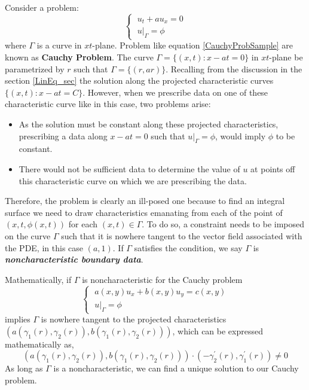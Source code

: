 \documentclass[11pt, a4paper]{report}
\begin{document}
Consider a problem: 
\begin{equation} \label{CauchyProbSample}
    \begin{cases}
        \; u_t + a{u_x} = 0\\[-0.5em]%
        \; u|_\Gamma = \phi
    \end{cases}
\end{equation}
where $\Gamma$ is a curve in $xt$-plane. Problem like equation \eqref{CauchyProbSample} are known as {\bfseries 
Cauchy Problem}. The curve $\Gamma = \{(x,t): x-at = 0\}$ in $xt$-plane be parametrized by $r$ such that 
$\Gamma = \{(r, ar)\}$. Recalling from the discussion in the section \ref{LinEq_sec} the solution along the 
projected characteristic curves $\{(x, t): x - at = C\}$. However, when we prescribe data on one of these 
characteristic curve like in this case, two problems arise:
\begin{itemize}
    \item As the solution must be constant along these projected characteristics, prescribing a data along
    $x-at = 0$ such that $u|_\Gamma = \phi$, would imply $\phi$ to be constant.

    \item There would not be sufficient data to determine the value of $u$ at points off this characteristic
    curve on which we are prescribing the data.
\end{itemize}
Therefore, the problem is clearly an ill-posed one because to find an integral surface we need to draw
characteristics emanating from each of the point of $(x, t, \phi(x, t))$ for each $(x, t)\in\Gamma$. To 
do so, a constraint needs to be imposed on the curve $\Gamma$ such that it is nowhere tangent to the vector
field associated with the PDE, in this case $(a, 1)$. If $\Gamma$ satisfies the condition, we say $\Gamma$
is {\emph{\bfseries noncharacteristic boundary data}}.

Mathematically, if $\Gamma$ is noncharacteristic for the Cauchy problem
\begin{equation*}
    \begin{cases}
        \; a(x,y)u_x + b(x,y)u_y = c(x, y)\\[-0.5em] %
        \; u|_\Gamma = \phi
    \end{cases}
\end{equation*}
implies $\Gamma$ is nowhere tangent to the projected characteristics $\left(a\left(\gamma_{1}(r), 
\gamma_{2}(r)\right), b\left(\gamma_{1}(r), \gamma_{2}(r)\right)\right)$, which can be expressed mathematically
as,
\begin{equation} \label{noncharacteristic}
    (a\left(\gamma_{1}(r), \gamma_{2}(r)\right), b\left(\gamma_{1}(r), \gamma_{2}(r)\right))\cdot\left(-\gamma_{2}^{\prime}(r), \gamma_{1}^{\prime}(r)\right) \neq 0
\end{equation}
As long as $\Gamma$ is a noncharacteristic, we can find a unique solution to our Cauchy problem. 
\end{document}
